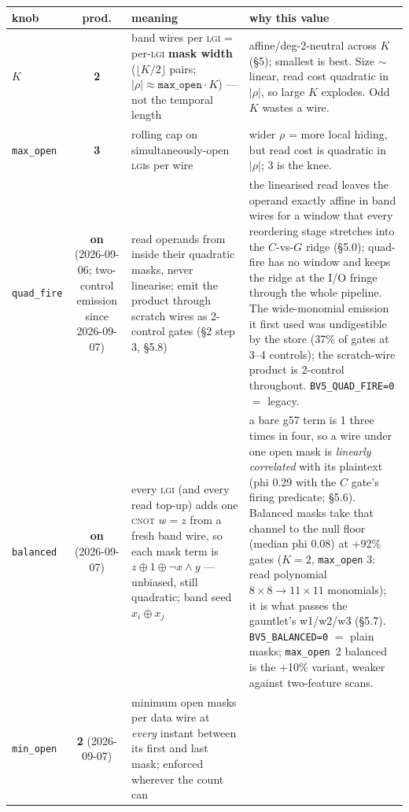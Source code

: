 \documentclass[11pt]{article}
\newcommand{\g}{\textsf{g57}}
\newcommand{\doc}[1]{\texttt{#1}}
\newcommand{\xor}{\oplus}
\newcommand{\lgi}{\textsc{lgi}}
\begin{document}
\begin{table}[H]\centering\small
\begin{tabular}{@{}lcL{3.4cm}L{5.0cm}@{}}
\toprule
knob & prod. & meaning & why this value \\
\midrule
$K$ & \textbf{2} & band wires per \lgi{} = per-\lgi{} \textbf{mask width}
  ($\lfloor K/2\rfloor$ pairs; $|\rho|\approx\doc{max\_open}\cdot K$) --- not the
  temporal length & affine/deg-2-neutral across $K$ (\S5); smallest is best. Size
  $\sim$linear, read cost quadratic in $|\rho|$, so large $K$ explodes. Odd $K$
  wastes a wire. \\
\addlinespace
\doc{max\_open} & \textbf{3} & rolling cap on simultaneously-open \lgi s per wire
  & wider $\rho$ = more local hiding, but read cost is quadratic in $|\rho|$; 3 is
  the knee. \\
\addlinespace
\doc{quad\_fire} & \textbf{on} (2026-09-06; two-control emission since 2026-09-07) &
  read operands from inside their quadratic masks, never linearise; emit the product
  through scratch wires as 2-control gates (\S2 step 3, \S5.8) & the linearised read
  leaves the operand exactly affine in band wires for a window that every reordering
  stage stretches into the $C$-vs-$G$ ridge (\S5.0); quad-fire has no window and keeps
  the ridge at the I/O fringe through the whole pipeline. The wide-monomial emission it
  first used was undigestible by the store (37\% of gates at 3--4 controls); the
  scratch-wire product is 2-control throughout.
  \doc{BV5\_QUAD\_FIRE=0} $=$ legacy. \\
\addlinespace
\doc{balanced} & \textbf{on} (2026-09-07) & every \lgi{} (and
  every read top-up) adds one \textsc{cnot} $w \mathrel{\hat{}}= z$ from a fresh band
  wire, so each mask term is $z \xor 1 \xor \neg x{\wedge}y$ --- unbiased, still
  quadratic; band seed $x_i \xor x_j$ & a bare \g{} term is 1 three times in four,
  so a wire under one open mask is \emph{linearly correlated} with its plaintext
  (phi 0.29 with the $C$ gate's firing predicate; \S5.6). Balanced masks take that
  channel to the null floor (median phi 0.08) at +92\% gates ($K{=}2$,
  \doc{max\_open} 3: read polynomial $8{\times}8 \to 11{\times}11$ monomials); it is
  what passes the gauntlet's w1/w2/w3 (\S5.7). \doc{BV5\_BALANCED=0} $=$ plain masks;
  \doc{max\_open}~2 balanced is the +10\% variant, weaker against two-feature scans. \\
\addlinespace
\doc{min\_open} & \textbf{2} (2026-09-07) & minimum open masks per data wire at
  \emph{every} instant between its first and last mask; enforced wherever the count can

\end{tabular}
\end{table}
\end{document}
